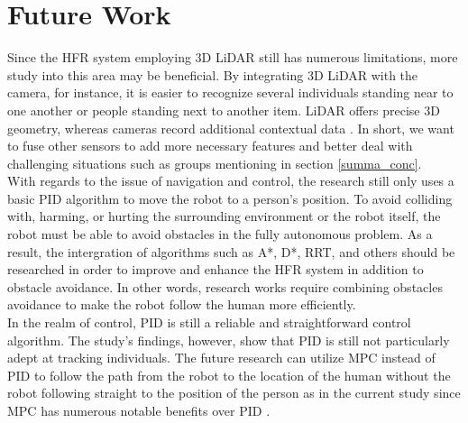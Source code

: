 \newpage

\section{Future Work}
\label{future_work}

Since the HFR system employing 3D LiDAR still has numerous limitations, more study 
into this area may be beneficial. By integrating 3D LiDAR with the camera, 
for instance, it is easier to recognize several individuals standing near to 
one another or people standing next to another item. LiDAR offers precise 3D 
geometry, whereas cameras record additional contextual data 
\cite{fusionlidarandcamera}. In short, we want to fuse other sensors to add more necessary features and better deal with challenging situations such as groups
mentioning in section \ref{summa_conc}.\\

With regards to the issue of navigation and control, the research still only 
uses a basic PID algorithm to move the robot to a person's position. 
To avoid colliding with, harming, or hurting the surrounding environment or the 
robot itself, the robot must be able to avoid obstacles in the fully autonomous 
problem. As a result, the intergration of algorithms such as A*, D*, RRT, 
and others \cite{lspathplanning} should be researched in order to improve and enhance the 
HFR system in addition to obstacle avoidance. In other words, research works require combining obstacles avoidance to make the robot follow the human more efficiently.\\

In the realm of control, PID is still a reliable and straightforward control 
algorithm. The study's findings, however, show that PID is still not particularly 
adept at tracking individuals. The future research can utilize MPC instead of PID 
to follow the path from the robot to the location of the human without the robot 
following straight to the position of the person as in the current study since 
MPC has numerous notable benefits over PID \cite{comparepidmpc}.


